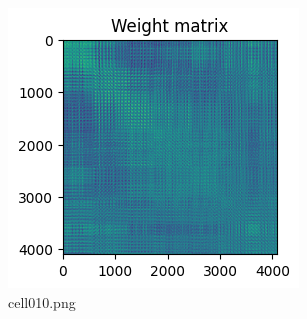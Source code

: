 \begin{figure}[ht]
	\centering
	\includegraphics[scale=0.8, max width=\linewidth]{./fig/energy-based-model/hopfield-model/cell010.png}
	\caption{cell010.png}
	\label{cell010.png}
\end{figure}